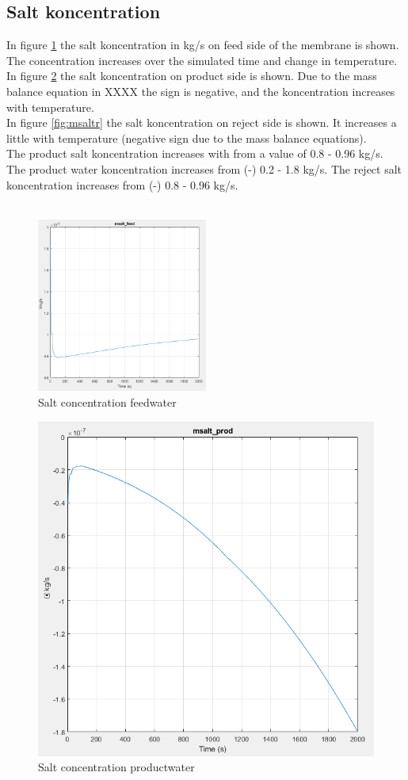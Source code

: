 \subsection{Salt koncentration}

In figure \ref{fig:msaltf} the salt koncentration in kg/s on feed side of the membrane is shown. The concentration increases over the simulated time and change in temperature. \\
In figure \ref{fig:msaltp} the salt koncentration on product side is shown. Due to the mass balance equation in XXXX the sign is negative, and the koncentration increases with temperature.\\
In figure \ref{fig:msaltr} the salt koncentration on reject side is shown. It increases a little with temperature (negative sign due to the mass balance equations).\\
The product salt koncentration increases with from a value of  0.8 - 0.96 kg/s. The product water koncentration increases from (-) 0.2 - 1.8 kg/s. The reject salt koncentration increases from (-) 0.8 - 0.96 kg/s.\\
\\
\begin{figure}[h]
\centering
    \includegraphics[width=0.5\textwidth]{msalt_feed.PNG}
    \caption{Salt concentration feedwater}
    \label{fig:msaltf}
\end{figure}
\begin{figure}[h]
\centering
  \includegraphics[width=0.5\linewidth]{msalt_prod.PNG}
  \caption{Salt concentration productwater}
  \label{fig:msaltp}
\end{figure}
